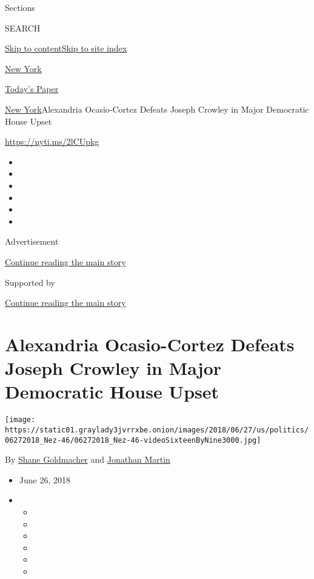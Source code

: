 Sections

SEARCH

\protect\hyperlink{site-content}{Skip to
content}\protect\hyperlink{site-index}{Skip to site index}

\href{https://www.nytimes3xbfgragh.onion/section/nyregion}{New York}

\href{https://myaccount.nytimes3xbfgragh.onion/auth/login?response_type=cookie\&client_id=vi}{}

\href{https://www.nytimes3xbfgragh.onion/section/todayspaper}{Today's
Paper}

\href{/section/nyregion}{New York}\textbar{}Alexandria Ocasio-Cortez
Defeats Joseph Crowley in Major Democratic House Upset

\href{https://nyti.ms/2lCUpkg}{https://nyti.ms/2lCUpkg}

\begin{itemize}
\item
\item
\item
\item
\item
\item
\end{itemize}

Advertisement

\protect\hyperlink{after-top}{Continue reading the main story}

Supported by

\protect\hyperlink{after-sponsor}{Continue reading the main story}

\hypertarget{alexandria-ocasio-cortez-defeats-joseph-crowley-in-major-democratic-house-upset}{%
\section{Alexandria Ocasio-Cortez Defeats Joseph Crowley in Major
Democratic House
Upset}\label{alexandria-ocasio-cortez-defeats-joseph-crowley-in-major-democratic-house-upset}}

\texttt{[image: https://static01.graylady3jvrrxbe.onion/images/2018/06/27/us/politics/06272018\_Nez-46/06272018\_Nez-46-videoSixteenByNine3000.jpg]}

By \href{https://www.nytimes3xbfgragh.onion/by/shane-goldmacher}{Shane
Goldmacher} and
\href{https://www.nytimes3xbfgragh.onion/by/jonathan-martin}{Jonathan
Martin}

\begin{itemize}
\item
  June 26, 2018
\item
  \begin{itemize}
  \item
  \item
  \item
  \item
  \item
  \item
  \end{itemize}
\end{itemize}

